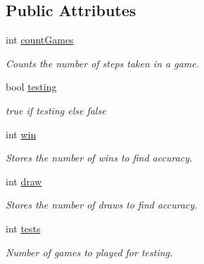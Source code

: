 \subsection*{Public Attributes}
\begin{DoxyCompactItemize}
\item 
\mbox{\label{classTicTacToe_a821713e03bf267232724ecdb5e5d3f3f}} 
int \mbox{\hyperlink{classTicTacToe_a821713e03bf267232724ecdb5e5d3f3f}{count\+Games}}
\begin{DoxyCompactList}\small\item\em Counts the number of steps taken in a game. \end{DoxyCompactList}\item 
\mbox{\label{classTicTacToe_a025803b36332f9def329d3f4b5de7f47}} 
bool \mbox{\hyperlink{classTicTacToe_a025803b36332f9def329d3f4b5de7f47}{testing}}
\begin{DoxyCompactList}\small\item\em true if testing else false \end{DoxyCompactList}\item 
\mbox{\label{classTicTacToe_ac4968fae69b8266f05268adf42e29260}} 
int \mbox{\hyperlink{classTicTacToe_ac4968fae69b8266f05268adf42e29260}{win}}
\begin{DoxyCompactList}\small\item\em Stores the number of wins to find accuracy. \end{DoxyCompactList}\item 
\mbox{\label{classTicTacToe_ad9fc2a45279911eb2b4ad010e62b2616}} 
int \mbox{\hyperlink{classTicTacToe_ad9fc2a45279911eb2b4ad010e62b2616}{draw}}
\begin{DoxyCompactList}\small\item\em Stores the number of draws to find accuracy. \end{DoxyCompactList}\item 
\mbox{\label{classTicTacToe_aba1ce3bbe1f2f7cc16f7d2e24789e171}} 
int \mbox{\hyperlink{classTicTacToe_aba1ce3bbe1f2f7cc16f7d2e24789e171}{tests}}
\begin{DoxyCompactList}\small\item\em Number of games to played for testing. \end{DoxyCompactList}\end{DoxyCompactItemize}



